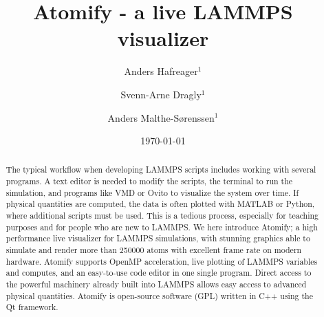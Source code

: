 \documentclass[aps,pre,twocolumn,letterpaper,floatfix]{revtex4}
\begin{document}
\title{Atomify - a live LAMMPS visualizer}
\author{Anders Hafreager$^1$}
\author{Svenn-Arne Dragly$^{1}$} 
\author{Anders Malthe-S\o renssen$^1$}
\date{\today} 


\begin{abstract}
%
The typical workflow when developing LAMMPS scripts includes working with
several programs.
A text editor is needed to modify the scripts,
the terminal to run the simulation, and programs like VMD or Ovito to visualize
the system over time.
If physical quantities are computed, the data is often plotted with MATLAB or
Python, where additional scripts must be used.
This is a tedious process, especially for teaching purposes and for people who
are new to LAMMPS.
We here introduce Atomify;
a high performance live visualizer for LAMMPS simulations,
with stunning graphics able to simulate and render more than 250000 atoms with
excellent frame rate on modern hardware.
Atomify supports OpenMP acceleration, live plotting of LAMMPS variables and
computes, and an easy-to-use code editor in one single program.
Direct access to the powerful machinery already built into LAMMPS allows easy
access to advanced physical quantities.
Atomify is open-source software (GPL) written in C++ using the Qt framework.
%
\end{abstract} 
 
\maketitle
\end{document}
